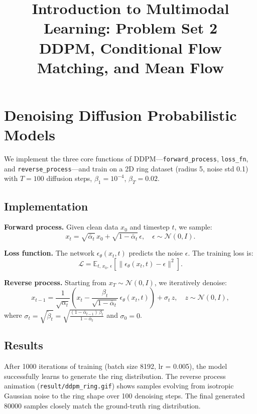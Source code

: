 \documentclass[11pt,a4paper]{article}
\title{\textbf{Introduction to Multimodal Learning: Problem Set 2} \\ \large DDPM, Conditional Flow Matching, and Mean Flow}
\author{}
\date{}
\begin{document}
\maketitle

\section{Denoising Diffusion Probabilistic Models}

We implement the three core functions of DDPM---\texttt{forward\_process}, \texttt{loss\_fn}, and \texttt{reverse\_process}---and train on a 2D ring dataset (radius 5, noise std 0.1) with $T=100$ diffusion steps, $\beta_1=10^{-4}$, $\beta_T=0.02$.

\subsection{Implementation}

\textbf{Forward process.} Given clean data $x_0$ and timestep $t$, we sample:
\[
    x_t = \sqrt{\bar\alpha_t}\, x_0 + \sqrt{1 - \bar\alpha_t}\, \epsilon, \quad \epsilon \sim \mathcal{N}(0, I).
\]

\textbf{Loss function.} The network $\epsilon_\theta(x_t, t)$ predicts the noise $\epsilon$. The training loss is:
\[
    \mathcal{L} = \mathbb{E}_{t,\, x_0,\, \epsilon}\left[\| \epsilon_\theta(x_t, t) - \epsilon \|^2\right].
\]

\textbf{Reverse process.} Starting from $x_T \sim \mathcal{N}(0,I)$, we iteratively denoise:
\[
    x_{t-1} = \frac{1}{\sqrt{\alpha_t}} \left( x_t - \frac{\beta_t}{\sqrt{1 - \bar\alpha_t}}\, \epsilon_\theta(x_t, t) \right) + \sigma_t\, z, \quad z \sim \mathcal{N}(0, I),
\]
where $\sigma_t = \sqrt{\tilde\beta_t} = \sqrt{\frac{(1-\bar\alpha_{t-1})\,\beta_t}{1-\bar\alpha_t}}$ and $\sigma_0 = 0$.

\subsection{Results}

After 1000 iterations of training (batch size 8192, lr = 0.005), the model successfully learns to generate the ring distribution. The reverse process animation (\texttt{result/ddpm\_ring.gif}) shows samples evolving from isotropic Gaussian noise to the ring shape over 100 denoising steps. The final generated 80000 samples closely match the ground-truth ring distribution.
\end{document}
